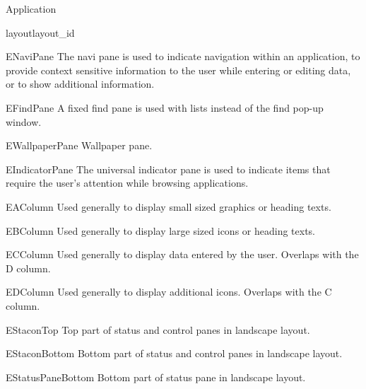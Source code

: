 \begin{classdesc*}{Application}
\begin{methoddesc}[Application]{layout}{layout_id}
\begin{datadesc}{ENaviPane} 
The navi pane is used to indicate navigation within an application, to provide 
context sensitive information to the user while entering or editing data, or to 
show additional information.  
\end{datadesc}

\begin{datadesc}{EFindPane} 
A fixed find pane is used with lists instead of the find pop-up window.  
\end{datadesc}

\begin{datadesc}{EWallpaperPane} 
Wallpaper pane.  
\end{datadesc}

\begin{datadesc}{EIndicatorPane} 
The universal indicator pane is used to indicate items that require the user's 
attention while browsing applications.  
\end{datadesc}

\begin{datadesc}{EAColumn} 
Used generally to display small sized graphics or heading texts.  
\end{datadesc}

\begin{datadesc}{EBColumn} 
Used generally to display large sized icons or heading texts.  
\end{datadesc}

\begin{datadesc}{ECColumn} 
Used generally to display data entered by the user. Overlaps with the D column. 
\end{datadesc}

\begin{datadesc}{EDColumn} 
Used generally to display additional icons. Overlaps with the C column. 
\end{datadesc}

\begin{datadesc}{EStaconTop} 
Top part of status and control panes in landscape layout.  
\end{datadesc}

\begin{datadesc}{EStaconBottom} 
Bottom part of status and control panes in landscape layout.  
\end{datadesc}

\begin{datadesc}{EStatusPaneBottom} 
Bottom part of status pane in landscape layout.  
\end{datadesc}


\end{methoddesc}
\end{classdesc*}
